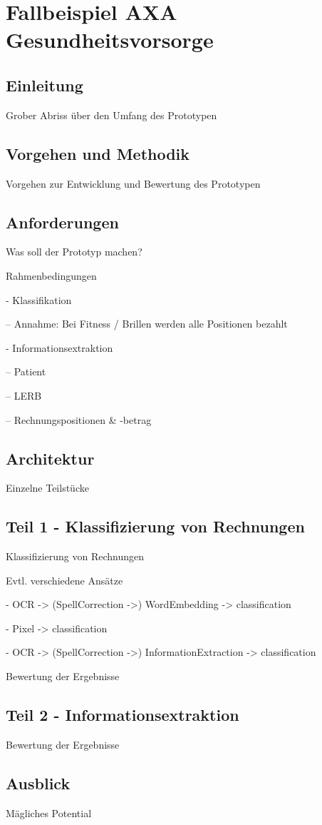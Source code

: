 \section{Fallbeispiel AXA Gesundheitsvorsorge}

\subsection{Einleitung}

Grober Abriss über den Umfang des Prototypen

\subsection{Vorgehen und Methodik}

Vorgehen zur Entwicklung und Bewertung des Prototypen

\subsection{Anforderungen}

Was soll der Prototyp machen?

Rahmenbedingungen

- Klassifikation

-- Annahme: Bei Fitness / Brillen werden alle Positionen bezahlt

- Informationsextraktion

-- Patient

-- LERB

-- Rechnungspositionen \& -betrag

\subsection{Architektur}

Einzelne Teilstücke

\subsection{Teil 1 - Klassifizierung von Rechnungen}

Klassifizierung von Rechnungen

Evtl. verschiedene Ansätze

- OCR -> (SpellCorrection ->) WordEmbedding -> classification

- Pixel -> classification

- OCR -> (SpellCorrection ->) InformationExtraction -> classification

Bewertung der Ergebnisse

\subsection{Teil 2 - Informationsextraktion}

Bewertung der Ergebnisse

\subsection{Ausblick}

Mägliches Potential


